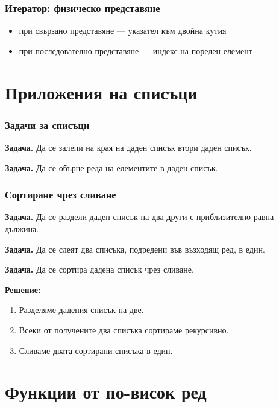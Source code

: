 \documentclass{beamer}
\begin{document}
\begin{frame}
  \frametitle{Итератор: физическо представяне}

  \begin{itemize}
  \item при свързано представяне --- указател към двойна кутия
  \item при последователно представяне --- индекс на пореден елемент
  \end{itemize}
\end{frame}

\section{Приложения на списъци}

\begin{frame}
  \frametitle{Задачи за списъци}

  \textbf{Задача.} Да се залепи на края на даден списък втори даден списък.
  \vspace{3em}
  \pause

  \textbf{Задача.} Да се обърне реда на елементите в даден списък.
\end{frame}

\begin{frame}
  \frametitle{Сортиране чрез сливане}

  \textbf{Задача.} Да се раздели даден списък на два други с приблизително равна дължина.
  \vspace{1em}
  \pause

  \textbf{Задача.} Да се слеят два списъка, подредени във възходящ ред, в един.
  \vspace{1em}
  \pause

  \textbf{Задача.} Да се сортира дадена списък чрез сливане.
  \vspace{1em}
  \pause

  \textbf{Решение:}
  \begin{enumerate}
  \item Разделяме дадения списък на две.
  \item Всеки от получените два списъка сортираме рекурсивно.
  \item Сливаме двата сортирани списъка в един.
  \end{enumerate}
\end{frame}

\section{Функции от по-висок ред}
\end{document}
